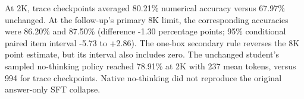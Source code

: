 At 2K, trace checkpoints averaged 80.21\% numerical accuracy versus 67.97\% unchanged. At the follow-up's primary 8K limit, the corresponding accuracies were 86.20\% and 87.50\% (difference -1.30 percentage points; 95\% conditional paired item interval -5.73 to +2.86). The one-box secondary rule reverses the 8K point estimate, but its interval also includes zero. The unchanged student's sampled no-thinking policy reached 78.91\% at 2K with 237 mean tokens, versus 994 for trace checkpoints. Native no-thinking did not reproduce the original answer-only SFT collapse.
